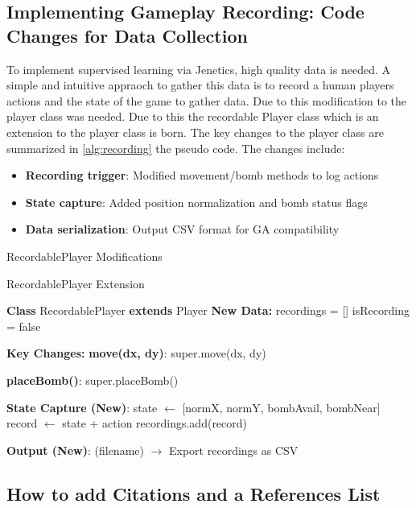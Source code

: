 \documentclass[sigconf]{acmart} %
\begin{document}
\subsection{Implementing Gameplay Recording: Code Changes for Data Collection}
To implement supervised learning via Jenetics, high quality data is needed. A simple and intuitive appraoch to gather this data is to record a human players actions and the state of the game to gather data. Due to this modification to the player class was needed. Due to this the recordable Player class which is an extension to the player class is born. The key changes to the player class are summarized in \ref{alg:recording} the pseudo code. The changes include: 
\begin{itemize}
    \item \textbf{Recording trigger}: Modified movement/bomb methods to log actions
    \item \textbf{State capture}: Added position normalization and bomb status flags
    \item \textbf{Data serialization}: Output CSV format for GA compatibility
\end{itemize}
\begin{algorithm}[t]
\caption{RecordablePlayer Modifications}
\label{alg:recording}
\DontPrintSemicolon
{}

\caption{RecordablePlayer Extension}
\textbf{Class} RecordablePlayer \textbf{extends} Player\;
\nl\textbf{New Data:} 
    recordings = [] \;
    isRecording = false 

\BlankLine
\nl\textbf{Key Changes:}\;
\nl \textbf{move(dx, dy)}:
    super.move(dx, dy)\;

\nl \textbf{placeBomb()}:
    super.placeBomb()\;

\nl\textbf{State Capture (New)}:
    state $\leftarrow$ [normX, normY, bombAvail, bombNear] 
    record $\leftarrow$ state + action \;
    recordings.add(record) \;

\nl\textbf{Output (New)}:
    \Save(filename) $\rightarrow$ Export recordings as CSV\;
\end{algorithm}

\subsection{How to add Citations and a References List}
\end{document}
